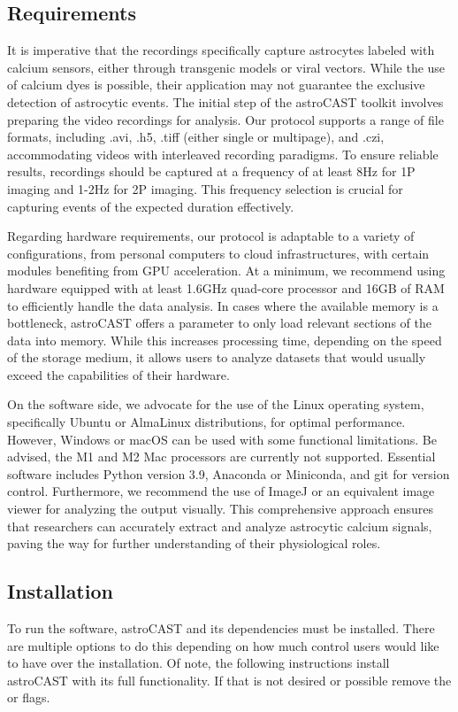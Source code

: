 \subsection{Requirements}
It is imperative that the recordings specifically capture astrocytes labeled with calcium sensors, either through transgenic models or viral vectors. While the use of calcium dyes is possible, their application may not guarantee the exclusive detection of astrocytic events. The initial step of the astroCAST toolkit involves preparing the video recordings for analysis. Our protocol supports a range of file formats, including .avi, .h5, .tiff (either single or multipage), and .czi, accommodating videos with interleaved recording paradigms. To ensure reliable results, recordings should be captured at a frequency of at least 8Hz for \ac{1P} imaging and 1-2Hz for \ac{2P} imaging. This frequency selection is crucial for capturing events of the expected duration effectively.

Regarding hardware requirements, our protocol is adaptable to a variety of configurations, from personal computers to cloud infrastructures, with certain modules benefiting from \ac{GPU} acceleration. At a minimum, we recommend using hardware equipped with at least 1.6GHz quad-core processor and 16GB of RAM to efficiently handle the data analysis. In cases where the available memory is a bottleneck, astroCAST offers a  parameter to only load relevant sections of the data into memory. While this increases processing time, depending on the speed of the storage medium, it allows users to analyze datasets that would usually exceed the capabilities of their hardware.

On the software side, we advocate for the use of the Linux operating system, specifically Ubuntu or AlmaLinux distributions, for optimal performance. However, Windows or macOS can be used with some functional limitations. Be advised, the M1 and M2 Mac processors are currently not supported. Essential software includes Python version 3.9, Anaconda or Miniconda, and git for version control. Furthermore, we recommend the use of ImageJ or an equivalent image viewer for analyzing the output visually. This comprehensive approach ensures that researchers can accurately extract and analyze astrocytic calcium signals, paving the way for further understanding of their physiological roles.

\subsection{Installation}
To run the software, astroCAST and its dependencies must be installed. There are multiple options to do this depending on how much control users would like to have over the installation. Of note, the following instructions install astroCAST with its full functionality. If that is not desired or possible remove the  or \inlineBash{[all]} flags.

